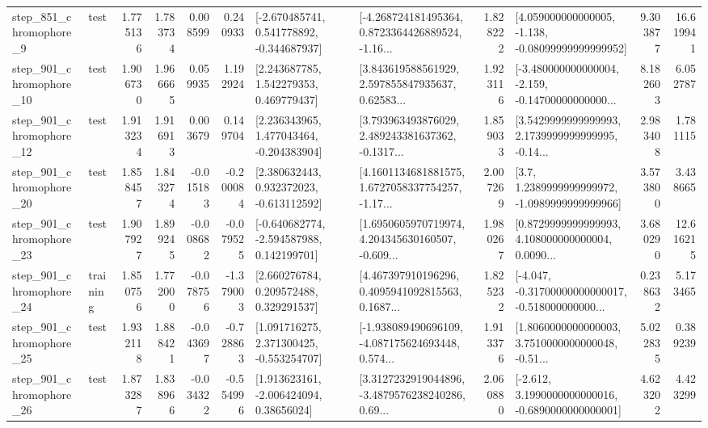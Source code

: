 \begin{tabular}{llrrrrllrlrr}
   step\_851\_chromophore\_9 &      test &      1.775136 &    1.783734 &      0.008599 &  0.240933 &   [-2.670485741, 0.541778892, -0.344687937] &  [-4.268724181495364, 0.8723364426889524, -1.16... &       1.828222 &  [4.059000000000005, -1.138, -0.08099999999999952] &            9.303877 &         16.619941 \\
  step\_901\_chromophore\_10 &      test &      1.906730 &    1.966665 &      0.059935 &  1.192924 &     [2.243687785, 1.542279353, 0.469779437] &  [3.843619588561929, 2.597855847935637, 0.62583... &       1.923116 &  [-3.480000000000004, -2.159, -0.14700000000000... &            8.182603 &          6.052787 \\
  step\_901\_chromophore\_12 &      test &      1.913234 &    1.916913 &      0.003679 &  0.149704 &    [2.236343965, 1.477043464, -0.204383904] &  [3.793963493876029, 2.489243381637362, -0.1317... &       1.859033 &  [3.5429999999999993, 2.1739999999999995, -0.14... &            2.983408 &          1.781115 \\
  step\_901\_chromophore\_20 &      test &      1.858457 &    1.843274 &     -0.015183 & -0.200084 &    [2.380632443, 0.932372023, -0.613112592] &  [4.1601134681881575, 1.6727058337754257, -1.17... &       2.007269 &     [3.7, 1.2389999999999972, -1.0989999999999966] &            3.573800 &          3.438665 \\
  step\_901\_chromophore\_23 &      test &      1.907927 &    1.899245 &     -0.008682 & -0.079525 &   [-0.640682774, -2.594587988, 0.142199701] &  [1.6950605970719974, 4.204345630160507, -0.609... &       1.980267 &  [0.8729999999999993, 4.108000000000004, 0.0090... &            3.680290 &         12.616215 \\
  step\_901\_chromophore\_24 &  training &      1.850756 &    1.772000 &     -0.078756 & -1.379003 &     [2.660276784, 0.209572488, 0.329291537] &  [4.467397910196296, 0.4095941092815563, 0.1687... &       1.825232 &  [-4.047, -0.31700000000000017, -0.518000000000... &            0.238632 &          5.173465 \\
  step\_901\_chromophore\_25 &      test &      1.932118 &    1.888421 &     -0.043697 & -0.728863 &    [1.091716275, 2.371300425, -0.553254707] &  [-1.938089490696109, -4.087175624693448, 0.574... &       1.913376 &  [1.8060000000000003, 3.7510000000000048, -0.51... &            5.022835 &          0.389239 \\
  step\_901\_chromophore\_26 &      test &      1.873287 &    1.838966 &     -0.034322 & -0.554996 &     [1.913623161, -2.006424094, 0.38656024] &  [3.3127232919044896, -3.4879576238240286, 0.69... &       2.060880 &  [-2.612, 3.1990000000000016, -0.6890000000000001] &            4.623202 &          4.423299 \\

\end{tabular}
